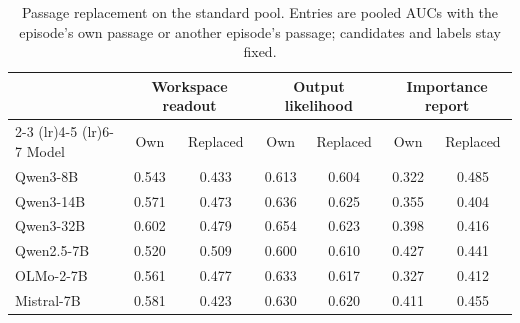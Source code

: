 \begin{table}[t]
\centering
\caption{Passage replacement on the standard pool. Entries are pooled AUCs with the episode's own passage or
another episode's passage; candidates and labels stay fixed.}
\label{tab:readoutshuffle}
\small
\setlength{\tabcolsep}{5pt}
\begin{tabular}{lcccccc}
\toprule
 & \multicolumn{2}{c}{Workspace readout} & \multicolumn{2}{c}{Output likelihood} & \multicolumn{2}{c}{Importance report} \\
\cmidrule(lr){2-3} \cmidrule(lr){4-5} \cmidrule(lr){6-7}
Model & Own & Replaced & Own & Replaced & Own & Replaced \\
\midrule
Qwen3-8B & 0.543 & 0.433 & 0.613 & 0.604 & 0.322 & 0.485 \\
Qwen3-14B & 0.571 & 0.473 & 0.636 & 0.625 & 0.355 & 0.404 \\
Qwen3-32B & 0.602 & 0.479 & 0.654 & 0.623 & 0.398 & 0.416 \\
Qwen2.5-7B & 0.520 & 0.509 & 0.600 & 0.610 & 0.427 & 0.441 \\
OLMo-2-7B & 0.561 & 0.477 & 0.633 & 0.617 & 0.327 & 0.412 \\
Mistral-7B & 0.581 & 0.423 & 0.630 & 0.620 & 0.411 & 0.455 \\
\bottomrule
\end{tabular}
\end{table}
